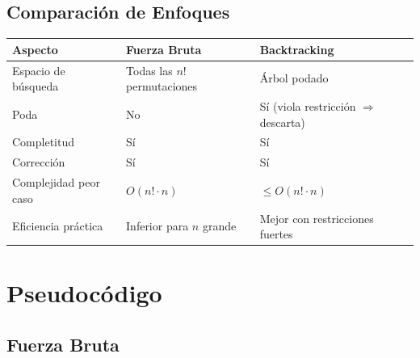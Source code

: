 \documentclass[12pt, a4paper]{article}
\begin{document}
\subsection{Comparación de Enfoques}

\begin{center}
\begin{tabular}{lll}
\toprule
\textbf{Aspecto}            & \textbf{Fuerza Bruta}         & \textbf{Backtracking}                  \\
\midrule
Espacio de búsqueda         & Todas las $n!$ permutaciones  & Árbol podado                           \\
Poda                        & No                            & Sí (viola restricción $\Rightarrow$ descarta) \\
Completitud                 & Sí                            & Sí                                     \\
Corrección                  & Sí                            & Sí                                     \\
Complejidad peor caso       & $O(n! \cdot n)$               & $\leq O(n! \cdot n)$                   \\
Eficiencia práctica         & Inferior para $n$ grande      & Mejor con restricciones fuertes        \\
\bottomrule
\end{tabular}
\end{center}

\section{Pseudocódigo}

\subsection{Fuerza Bruta}
\end{document}
